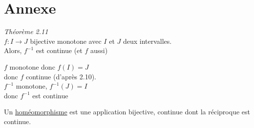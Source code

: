 \part{Annexe}

\begin{thm}
	{\it Théorème 2.11}\\
	$f: I \to J$ bijective monotone avec $I$ et $J$ deux intervalles.\\
	Alors, $f^{-1}$ est continue (et $f$ aussi)
\end{thm}

\begin{prv}
	$f$ monotone donc $f(I) = J$\\
	donc $f$ continue (d'après 2.10).\\
	$f^{-1}$ monotone, $f^{-1}(J) = I$\\
	donc $f^{-1}$ est continue
\end{prv}

\begin{defn}
	Un \underline{homéomorphisme} est une application bijective, continue dont la réciproque est continue.
\end{defn}
